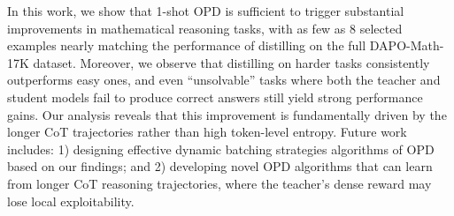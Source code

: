 In this work, we show that 1-shot OPD is sufficient to trigger substantial improvements in mathematical reasoning tasks, with as few as 8 selected examples nearly matching the performance of distilling on the full DAPO-Math-17K dataset. Moreover, we observe that distilling on harder tasks consistently outperforms easy ones, and even ``unsolvable'' tasks where both the teacher and student models fail to produce correct answers still yield strong performance gains. Our analysis reveals that this improvement is fundamentally driven by the longer CoT trajectories rather than high token-level entropy. Future work includes: 1) designing effective dynamic batching strategies algorithms of OPD based on our findings; and 2) developing novel OPD algorithms that can learn from longer CoT reasoning trajectories, where the teacher’s dense reward may lose local exploitability.